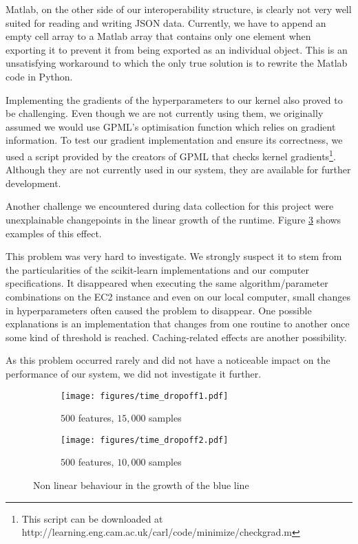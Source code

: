 \documentclass[a4paper,12pt,twoside,openright]{report}
\begin{document}
Matlab, on the other side of our interoperability structure, is clearly not very well suited for reading and writing JSON data. Currently, we have to append an empty cell array to a Matlab array that contains only one element when exporting it to prevent it from being exported as an individual object. This is an unsatisfying workaround to which the only true solution is to rewrite the Matlab code in Python.

Implementing the gradients of the hyperparameters to our kernel also proved to be challenging. Even though we are not currently using them, we originally assumed we would use GPML's optimisation function which relies on gradient information. To test our gradient implementation and ensure its correctness, we used a script provided by the creators of GPML that checks kernel gradients\footnote{This script can be downloaded at http://learning.eng.cam.ac.uk/carl/code/minimize/checkgrad.m}. Although they are not currently used in our system, they are available for further development.

Another challenge we encountered during data collection for this project were unexplainable changepoints in the linear growth of the runtime. Figure \ref{time_hinge} shows examples of this effect.

This problem was very hard to investigate. We strongly suspect it to stem from the particularities of the scikit-learn implementations and our computer specifications. It  disappeared when executing the same algorithm/parameter combinations on the EC2 instance and even on our local computer, small changes in hyperparameters often caused the problem to disappear. One possible explanations is an implementation that changes from one routine to another once some kind of threshold is reached. Caching-related effects are another possibility.

As this problem occurred rarely and did not have a noticeable impact on the performance of our system, we did not investigate it further.


\begin{figure}
\centering
\begin{subfigure}{.45\textwidth}
  \centering
  \texttt{[image: figures/time\_dropoff1.pdf]}
  \caption{$500$ features, $15,000$ samples}
  \label{time_dropoff1}
\end{subfigure}%
\begin{subfigure}{.45\textwidth}
  \centering
  \texttt{[image: figures/time\_dropoff2.pdf]}
  \caption{$500$ features, $10,000$ samples}
  \label{time_dropoff2}
\end{subfigure}
\caption{Non linear behaviour in the growth of the blue line}
\label{time_hinge}
\end{figure}
\end{document}
